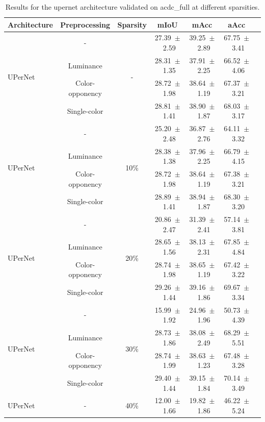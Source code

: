 \begin{table}[h]
\centering
\caption{Results for the upernet architecture validated on acdc_full at different sparsities.}
\begin{tabular}{@{}lccc ccc@{}}
\toprule
Architecture & Preprocessing & Sparsity & mIoU & mAcc & aAcc \\
\midrule

\multirow{4}{*}{UPerNet} & - & \multirow{4}{*}{-} & 27.39~$\pm$~2.59 & 39.25~$\pm$~2.89 & 67.75~$\pm$~3.41 \\
& Luminance & & 28.31~$\pm$~1.35 & 37.91~$\pm$~2.25 & 66.52~$\pm$~4.06 \\
& Color-opponency & & 28.72~$\pm$~1.98 & 38.64~$\pm$~1.19 & 67.37~$\pm$~3.21 \\
& Single-color & & 28.81~$\pm$~1.41 & 38.90~$\pm$~1.87 & 68.03~$\pm$~3.17 \\
\midrule
\multirow{4}{*}{UPerNet} & - & \multirow{4}{*}{10\%} & 25.20~$\pm$~2.48 & 36.87~$\pm$~2.76 & 64.11~$\pm$~3.32 \\
& Luminance & & 28.38~$\pm$~1.38 & 37.96~$\pm$~2.25 & 66.79~$\pm$~4.15 \\
& Color-opponency & & 28.72~$\pm$~1.98 & 38.64~$\pm$~1.19 & 67.38~$\pm$~3.21 \\
& Single-color & & 28.89~$\pm$~1.41 & 38.94~$\pm$~1.87 & 68.30~$\pm$~3.20 \\
\midrule
\multirow{4}{*}{UPerNet} & - & \multirow{4}{*}{20\%} & 20.86~$\pm$~2.47 & 31.39~$\pm$~2.41 & 57.14~$\pm$~3.81 \\
& Luminance & & 28.65~$\pm$~1.56 & 38.13~$\pm$~2.31 & 67.85~$\pm$~4.84 \\
& Color-opponency & & 28.74~$\pm$~1.98 & 38.65~$\pm$~1.19 & 67.42~$\pm$~3.22 \\
& Single-color & & 29.26~$\pm$~1.44 & 39.16~$\pm$~1.86 & 69.67~$\pm$~3.34 \\
\midrule
\multirow{4}{*}{UPerNet} & - & \multirow{4}{*}{30\%} & 15.99~$\pm$~1.92 & 24.96~$\pm$~1.96 & 50.73~$\pm$~4.39 \\
& Luminance & & 28.73~$\pm$~1.86 & 38.08~$\pm$~2.49 & 68.29~$\pm$~5.51 \\
& Color-opponency & & 28.74~$\pm$~1.99 & 38.63~$\pm$~1.23 & 67.48~$\pm$~3.28 \\
& Single-color & & 29.40~$\pm$~1.44 & 39.15~$\pm$~1.84 & 70.14~$\pm$~3.49 \\
\midrule
\multirow{4}{*}{UPerNet} & - & \multirow{4}{*}{40\%} & 12.00~$\pm$~1.66 & 19.82~$\pm$~1.86 & 46.22~$\pm$~5.24 \\

\end{tabular}
\end{table}
